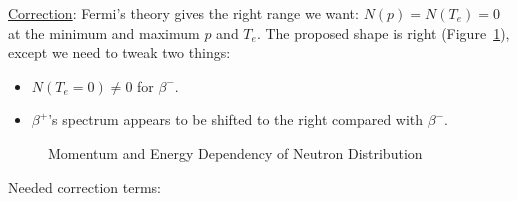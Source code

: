 \documentclass{school-22.101-notes}
\begin{document}
\uline{Correction}: Fermi's theory gives the right range we want: $N(p) = N(T_e) = 0$ at the minimum and maximum $p$ and $T_e$. The proposed shape is right (Figure~\ref{distribution}), except we need to tweak two things: 
\begin{itemize}
\item $N(T_e = 0) \neq 0$ for $\beta^-$. 
\item $\beta^+$'s spectrum appears to be shifted to the right compared with $\beta^-$. 
\end{itemize} 
\begin{figure}
  \centering
  \caption{Momentum and Energy Dependency of Neutron Distribution}  \label{distribution}
\end{figure}
Needed correction terms: 
\end{document}
